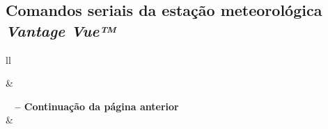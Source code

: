 \begin{anexosenv}
\chapter{Comandos seriais da estação meteorológica \textit{Vantage Vue™}} \label{anex:anexo1}

\begin{center}
\begin{longtable}{ll}

\hline
{} &  \\ \hline
\endfirsthead

%
{{\bfseries \tablename\ \thetable{} -- Continuação da página anterior}} \\

\hline
{} &  \\ \hline
\endhead

 \\
\endfoot

\endlastfoot


\end{longtable}
\end{center}
\end{anexosenv}
